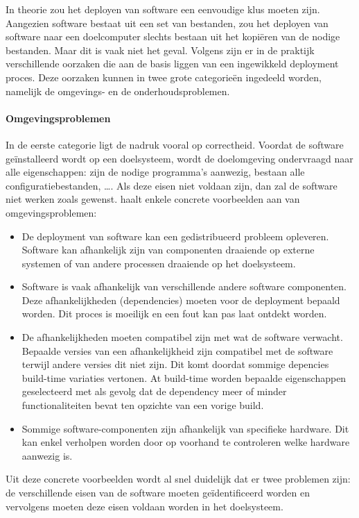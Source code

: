 In theorie zou het deployen van software een eenvoudige klus moeten zijn.
Aangezien software bestaat uit een set van bestanden, zou het deployen van software naar een doelcomputer slechts bestaan uit het kopiëren van de nodige bestanden.
Maar dit is vaak niet het geval.
Volgens \citet{dolstra2006purely} zijn er in de praktijk verschillende oorzaken die aan de basis liggen van een ingewikkeld deployment proces.
Deze oorzaken kunnen in twee grote categorieën ingedeeld worden, namelijk de omgevings- en de onderhoudsproblemen.

\paragraph{Omgevingsproblemen}
In de eerste categorie ligt de nadruk vooral op correctheid.
Voordat de software geïnstalleerd wordt op een doelsysteem, wordt de doelomgeving ondervraagd naar alle eigenschappen: zijn de nodige programma's aanwezig, bestaan alle configuratiebestanden, \ldots .
Als deze eisen niet voldaan zijn, dan zal de software niet werken zoals gewenst.
\citet{dolstra2006purely} haalt enkele concrete voorbeelden aan van omgevingsproblemen:
\begin{itemize}
\item De deployment van software kan een gedistribueerd probleem opleveren.
Software kan afhankelijk zijn van componenten draaiende op externe systemen of van andere processen draaiende op het doelsysteem.  
\item Software is vaak afhankelijk van verschillende andere software componenten. 
Deze afhankelijkheden (dependencies) moeten voor de deployment bepaald worden.
Dit proces is moeilijk en een fout kan pas laat ontdekt worden.
\item De afhankelijkheden moeten compatibel zijn met wat de software verwacht.
Bepaalde versies van een afhankelijkheid zijn compatibel met de software terwijl andere versies dit niet zijn.
Dit komt doordat sommige depencies build-time variaties vertonen.
At build-time worden bepaalde eigenschappen geselecteerd met als gevolg dat de dependency meer of minder functionaliteiten bevat ten opzichte van een vorige build.
\item Sommige software-componenten zijn afhankelijk van specifieke hardware.
Dit kan enkel verholpen worden door op voorhand te controleren welke hardware aanwezig is.
\end{itemize}

Uit deze concrete voorbeelden wordt al snel duidelijk dat er twee problemen zijn: de verschillende eisen van de software moeten geïdentificeerd worden en vervolgens moeten deze eisen voldaan worden in het doelsysteem.

